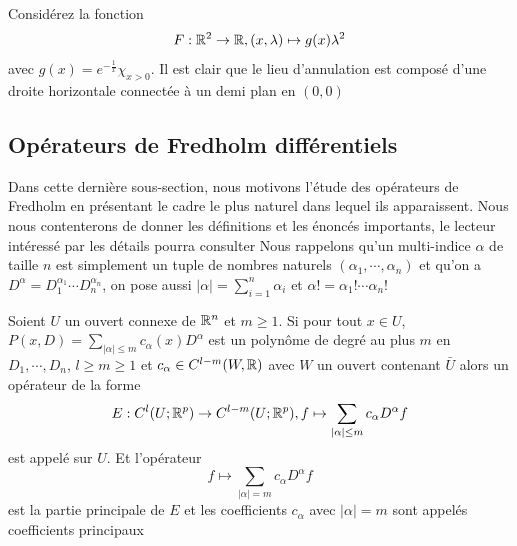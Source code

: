 \documentclass[memoire.tex]{subfiles}
\begin{document}
\begin{exemple}
    Considérez la fonction
    \begin{equation*}
        F: \mathbb{R}^2\rightarrow \mathbb{R}, (x,\lambda)\mapsto g(x)\lambda^2
    \end{equation*}
    avec $g(x)=e^{-\frac{1}{x}}\chi_{x>0}$. Il est clair que le lieu d'annulation est composé d'une droite horizontale connectée à un demi plan en $(0,0)$
\end{exemple}


\subsection{Opérateurs de Fredholm différentiels}
Dans cette dernière sous-section, nous motivons l'étude des opérateurs de Fredholm en présentant le cadre le plus naturel dans lequel ils apparaissent. Nous nous contenterons de donner les définitions et les énoncés importants, le lecteur intéressé par les détails pourra consulter \cite{berger1977nonlinearity}
Nous rappelons qu'un multi-indice $\alpha$ de taille $n$ est simplement un tuple de nombres naturels $(\alpha_1,\cdots,\alpha_n)$ et qu'on a $D^{\alpha}=D^{\alpha_1}_1\cdots D^{\alpha_n}_n$, on pose aussi $|\alpha|=\sum_{i=1}^n \alpha_i$ et $\alpha !=\alpha_1!\cdots\alpha_n!$
\begin{definition}
    Soient $U$ un ouvert connexe de $\mathbb{R}^n$ et $m\geq 1$. Si pour tout $x\in U$, 
    $P(x,D)=\sum_{|\alpha|\leq m} c_{\alpha}(x) D^{\alpha}$ est un polynôme de degré au plus $m$ en $D_1,\cdots,D_n$, $l\geq m\geq 1$ et $c_\alpha\in C^{l-m}(W,\mathbb{R})$ avec $W$ un ouvert contenant $\bar{U}$ alors un opérateur de la forme 
    \begin{equation}\label{ellipticop}
        E: C^{l}(U;\mathbb{R}^p)\rightarrow C^{l-m}(U;\mathbb{R}^p), f 
        \mapsto \sum_{|\alpha|\leq m} c_{\alpha} D^{\alpha}f
    \end{equation}
    est appelé  sur $U$.
    Et l'opérateur
    \begin{equation}\label{principalpart}
        f\mapsto \sum_{|\alpha|= m} c_{\alpha}D^{\alpha}f
    \end{equation}
    est la partie principale de  $E$ et les coefficients $c_
    {\alpha}$ avec $|\alpha|=m$ sont appelés coefficients 
    principaux
\end{definition}
\end{document}
